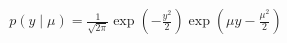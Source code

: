 \documentclass[preview]{standalone}
\begin{document}
\begin{align*}
p(y \mid \mu)= \frac{1}{\sqrt{2 \pi}} \exp (-\frac{y^2}{2}) \exp ( \mu y - \frac{\mu^2}{2} )
\end{align*}
\end{document}
